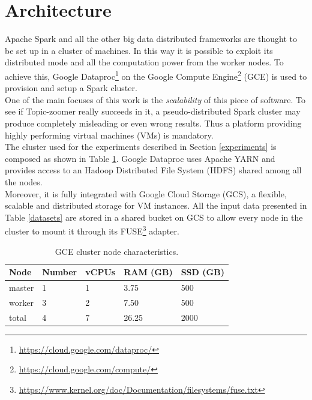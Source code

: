 \documentclass{sig-alternate-05-2015}
\begin{document}
\section{Architecture}
Apache Spark and all the other big data distributed frameworks are thought to be set up in a cluster of machines. In this way it is possible to exploit its distributed mode and all the computation power from the worker nodes. To achieve this, Google Dataproc\footnote{\url{https://cloud.google.com/dataproc/}} on the Google Compute Engine\footnote{\url{https://cloud.google.com/compute/}} (GCE) is used to provision and setup a Spark cluster.\\

One of the main focuses of this work is the \emph{scalability} of this piece of software. To see if Topic-zoomer really succeeds in it, a pseudo-distributed Spark cluster may produce completely misleading or even wrong results. Thus a platform providing highly performing virtual machines (VMs) is mandatory.\\
The cluster used for the experiments described in Section \ref{experiments} is composed as shown in Table \ref{cluster}. Google Dataproc uses Apache YARN and provides access to an Hadoop Distributed File System (HDFS) shared among all the nodes.\\
Moreover, it is fully integrated with Google Cloud Storage (GCS), a flexible, scalable and distributed storage for VM instances. All the input data presented in Table \ref{datasets} are stored in a shared bucket on GCS to allow every node in the cluster to mount it through its FUSE\footnote{\url{https://www.kernel.org/doc/Documentation/filesystems/fuse.txt}} adapter.

\begin{table}[]
    \centering
    \caption{GCE cluster node characteristics.}
    \label{cluster}
    \begin{tabular}{lllll}
    \hline
    Node   & Number & vCPUs & RAM (GB) & SSD (GB) \\
    \hline
    master & 1      & 1     & 3.75     & 500      \\
    worker & 3      & 2     & 7.50     & 500      \\
    \hline
    total  & 4      & 7     & 26.25    & 2000
    \end{tabular}
\end{table}
\end{document}
